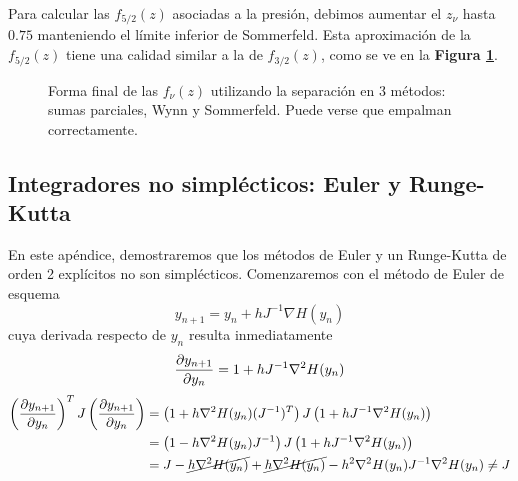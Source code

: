 Para calcular las $f_{5/2}(z)$ asociadas a la presión, debimos aumentar el $z_\nu$ hasta $0.75$ manteniendo el límite inferior de Sommerfeld.
Esta aproximación de la $f_{5/2}(z)$ tiene una calidad similar a la de $f_{3/2}(z)$, como se ve en la \textbf{Figura \ref{fig:f32_f52}}.

\begin{figure}[H]
	\centering
	\hspace{0.05\columnwidth}
	\caption{Forma final de las $f_\nu(z)$ utilizando la separación en 3 métodos: sumas parciales, Wynn y Sommerfeld. Puede verse que empalman correctamente.}
	\label{fig:f32_f52}
\end{figure}


\subsection{Integradores no simplécticos: Euler y Runge-Kutta}

En este apéndice, demostraremos que los métodos de Euler y un Runge-Kutta de orden 2 explícitos no son simplécticos. 
Comenzaremos con el método de Euler de esquema
\[ y_{n+1} = y_n + h J^{-1} \nabla H(y_n) \]
cuya derivada respecto de $y_n$ resulta inmediatamente
\[ \frac{\partial y_{n+1}}{\partial y_n} = 1 + hJ^{-1}\nabla^2H (y_n)\]
\begin{align*}
 \left( \frac{\partial y_{n+1}}{\partial y_n} \right)^T J \left( \frac{\partial y_{n+1}}{\partial y_n} \right) &= \left(1 + h\nabla^2 H(y_n)(J^{-1})^T\right) J \left(1 + hJ^{-1}\nabla^2 H(y_n)\right) \\
 &= \left(1 - h\nabla^2 H(y_n)J^{-1}\right) J \left(1 + hJ^{-1}\nabla^2 H(y_n)\right) \\
 &= J - \cancel{h\nabla^2 H(y_n)} + \cancel{h\nabla^2 H(y_n)} - h^2\nabla^2 H(y_n)J^{-1}\nabla^2 H(y_n) \neq J
\end{align*}

